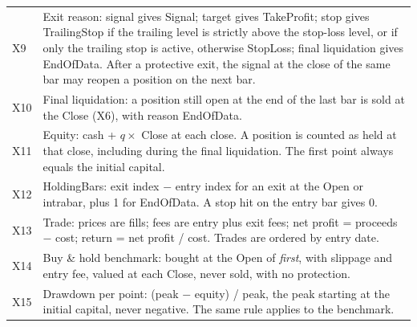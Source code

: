 \documentclass[11pt,a4paper]{article}
\begin{document}
\begin{longtable}{@{}p{0.9cm}p{14.8cm}@{}}
X9 & Exit reason: signal gives Signal; target gives TakeProfit; stop gives TrailingStop if the trailing level is strictly above the stop-loss level, or if only the trailing stop is active, otherwise StopLoss; final liquidation gives EndOfData. After a protective exit, the signal at the close of the same bar may reopen a position on the next bar. \\
X10 & Final liquidation: a position still open at the end of the last bar is sold at the Close (X6), with reason EndOfData. \\
X11 & Equity: cash + $q \times$ Close at each close. A position is counted as held at that close, including during the final liquidation. The first point always equals the initial capital. \\
X12 & HoldingBars: exit index $-$ entry index for an exit at the Open or intrabar, plus 1 for EndOfData. A stop hit on the entry bar gives 0. \\
X13 & Trade: prices are fills; fees are entry plus exit fees; net profit = proceeds $-$ cost; return = net profit / cost. Trades are ordered by entry date. \\
X14 & Buy \& hold benchmark: bought at the Open of \textit{first}, with slippage and entry fee, valued at each Close, never sold, with no protection. \\
X15 & Drawdown per point: (peak $-$ equity) / peak, the peak starting at the initial capital, never negative. The same rule applies to the benchmark. \\
\bottomrule
\end{longtable}
\end{document}
